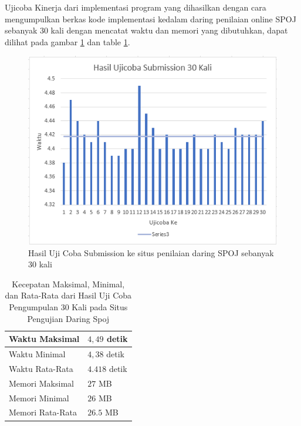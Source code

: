 Ujicoba Kinerja dari implementasi program yang dihasilkan dengan cara mengumpulkan berkas kode implementasi kedalam daring penilaian online SPOJ sebanyak 30 kali dengan mencatat waktu dan memori yang dibutuhkan, dapat dilihat pada gambar \ref{fig:asf} dan table \ref{tab:statistik}.
\begin{figure}[H]
\centering
\includegraphics[scale=0.4]{images/uji31.png}
\caption{Hasil Uji Coba Submission ke situs penilaian daring SPOJ sebanyak 30 kali}
\label{fig:asf}
\end{figure}
\begin{table}[H]
	\centering
	\begin{tabular}{|l|l|} \hline
		Waktu Maksimal & $ 4,49 $ detik\\ \hline
		Waktu Minimal & $ 4,38 $ detik\\ \hline
		Waktu Rata-Rata & $ 4.418 $ detik\\ \hline
		Memori Maksimal & $ 27 $ MB\\ \hline
		Memori Minimal & $ 26 $ MB\\ \hline
		Memori Rata-Rata & $ 26.5 $ MB\\ \hline
	\end{tabular}
	\caption{Kecepatan Maksimal, Minimal, dan Rata-Rata dari Hasil Uji Coba Pengumpulan 30 Kali pada Situs Pengujian Daring Spoj}
	\label{tab:statistik}
\end{table}



